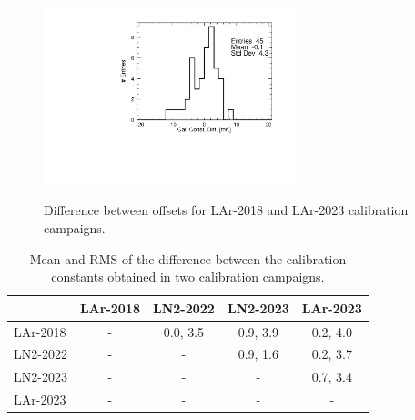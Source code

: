\begin{figure}[htbp]
\centering
{\includegraphics[width=0.65\textwidth]{images/figure_22.pdf}}
\caption{Difference between offsets for LAr-2018 and LAr-2023 calibration campaigns.}
\label{fig:LAr2018AllDiff}
\end{figure}

\begin{table}[htbp]
\begin{center}
\begin{tabular}{l c c c c}
         & LAr-2018 & LN2-2022 & LN2-2023 & LAr-2023  \\ \hline
LAr-2018 &    -     & 0.0, 3.5& 0.9, 3.9 & 0.2, 4.0 \\
LN2-2022 &    -     &    -     & 0.9, 1.6 &  0.2, 3.7 \\
LN2-2023 &    -     &    -     &    -     & 0.7, 3.4 \\
LAr-2023 &    -     &    -     &    -     &     -     \\
\end{tabular}
\end{center}
\caption{Mean and RMS of the difference between the calibration constants obtained in two calibration campaigns.}
\label{tab:calib_comparison}
\end{table}

